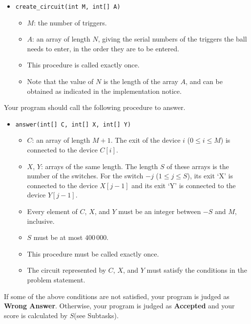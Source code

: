 \begin{itemize}
    \item \texttt{create\_circuit(int M, int[] A)}
    \begin{itemize}
        \item $M$: the number of triggers.
        \item $A$: an array of length $N$, giving the serial numbers of the triggers the ball needs to enter, in the order they are to be entered. 
        \item This procedure is called exactly once. \item Note that the value of $N$ is the length of the array $A$, and can be obtained as indicated in the implementation notice.
    \end{itemize}
\end{itemize}
Your program should call the following procedure to answer.
\begin{itemize}
\item \texttt{answer(int[] C, int[] X, int[] Y)}
\begin{itemize}
    \item $C$: an array of length $M+1$. The exit of the device $i$ ($0 \le i \le M$) is connected to
the device $C[i]$.
    \item $X$, $Y$: arrays of the same length. The length $S$ of these arrays is the number of the
switches. For the switch $-j$ ($1 \le j \le S$), its exit `X' is connected to the device $X[j - 1]$ and its exit `Y' is connected to the device $Y[j - 1]$.
    \item Every element of $C$, $X$, and $Y$ must be an integer between $-S$ and $M$, inclusive.
    \item $S$ must be at most $400\,000$.
    \item This procedure must be called exactly once.
    \item The circuit represented by $C$, $X$, and $Y$ must satisfy the conditions in the problem
statement.
\end{itemize}
\end{itemize}


If some of the above conditions are not satisfied, your program is judged as \textbf{Wrong
Answer}. Otherwise, your program is judged as \textbf{Accepted} and your score is calculated
by $S$(see Subtasks).